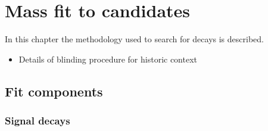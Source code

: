 \chapter{Mass fit to \decay{\Bp}{\Dsp\phiz} candidates} 
\label{ch:B2DsPhi}

\minitoc

In this chapter the methodology used to search for \decay{\Bp}{\Dsp\phiz} decays is described.

{\color{Red}
\begin{itemize}
\item Details of blinding procedure for historic context
\end{itemize}
}

\section{Fit components}
\label{sec:B2DsPhi_fitcomponents}


\subsection{Signal decays}
\label{sec:B2DsPhi_signalcomps}

